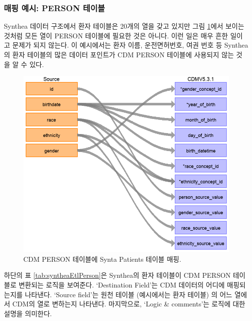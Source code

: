 \documentclass[11pt]{book}
\theoremstyle{definition}
\theoremstyle{definition}
\theoremstyle{definition}
\theoremstyle{remark}
\begin{document}
\subsubsection*{매핑 예시: PERSON 테이블}\label{--person-}

Synthea 데이터 구조에서 환자 테이블은 20개의 열을 갖고 있지만 그림
\ref{fig:syntheaPerson}에서 보이는 것처럼 모든 열이 PERSON 테이블에
필요한 것은 아니다. 이런 일은 매우 흔한 일이고 문제가 되지 않는다. 이
예시에서는 환자 이름, 운전면허번호, 여권 번호 등 Synthea의 환자 테이블의
많은 데이터 포인트가 CDM PERSON 테이블에 사용되지 않는 것을 알 수 있다.

\begin{figure}

{\centering \includegraphics[width=1\linewidth]{images/ExtractTransformLoad/syntheaPersonTable} 

}

\caption{CDM PERSON 테이블에 Synta Patients 테이블 매핑.}\label{fig:syntheaPerson}
\end{figure}

하단의 표 \ref{tab:syntheaEtlPerson}은 Synthea의 환자 테이블이 CDM
PERSON 테이블로 변환되는 로직을 보여준다. `Destination Field'는 CDM
데이터의 어디에 매핑되는지를 나타낸다. `Source field'는 원천 테이블
(예시에서는 환자 테이블) 의 어느 열에서 CDM의 열로 변하는지 나타낸다.
마지막으로, `Logic \& comments'는 로직에 대한 설명을 의미한다.
\end{document}
